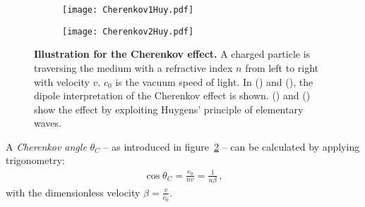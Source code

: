 \begin{figure}[H]
	\ContinuedFloat
	\begin{subfigure}[t]{0.45\textwidth}
		\texttt{[image: Cherenkov1Huy.pdf]}
		\label{airshowers:cherenkov1huy}
	\end{subfigure}
	\hfill
	\begin{subfigure}[t]{0.45\textwidth}
		\texttt{[image: Cherenkov2Huy.pdf]}
		\label{airshowers:cherenkov2huy}
	\end{subfigure}
	\caption[Illustration for the Cherenkov effect]{\textbf{Illustration for the Cherenkov effect.} A charged particle is traversing the medium with a refractive index $n$ from left to right with velocity $v$. $c_0$ is the vacuum speed of light. In () and (), the dipole interpretation of the Cherenkov effect is shown. () and () show the effect by exploiting Huygens' principle of elementary waves.}
	\label{airshowers:cherenkov}
\end{figure}
A \textit{Cherenkov angle} $\theta_C$ -- as introduced in figure~\ref{airshowers:cherenkov2huy} -- can be calculated by applying trigonometry:
\begin{align}
\cos{\theta_C} = \frac{c_0}{nv} = \frac{1}{n\beta}\,,
\end{align}
with the dimensionless velocity $\beta = \frac{v}{c_0}$.\\

